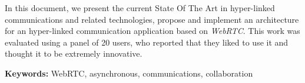 
{\color{blue}
In this document, we present the current State Of The Art in hyper-linked communications and related technologies, propose and implement an architecture for an hyper-linked communication application based on \emph{WebRTC}. This work was evaluated using a panel of 20 users, who reported that they liked to use it and thought it to be extremely innovative. 
}


\vspace{1cm}

\textbf{\Large Keywords:} WebRTC, asynchronous, communications, collaboration


\cleardoublepage
